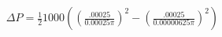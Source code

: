 \documentclass[preview]{standalone}
\begin{document}
\begin{align*}
\Delta P = \frac{1}{2} 1000 ((\frac{.00025}{0.00025\pi})^2 - (\frac{.00025}{0.00000625\pi})^2)
\end{align*}
\end{document}
